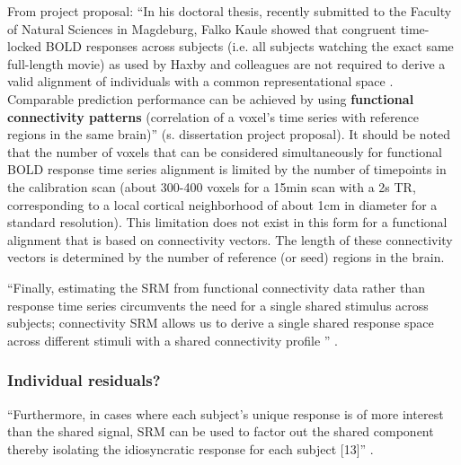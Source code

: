 From project proposal: ``In his doctoral thesis, recently submitted to the
Faculty of Natural Sciences in Magdeburg, Falko Kaule showed that congruent
time-locked BOLD responses across subjects (i.e. all subjects watching the exact
same full-length movie) as used by Haxby and colleagues are not required to
derive a valid alignment of individuals with a common representational space
\citep{kaule2017examination}.
%
Comparable prediction performance can be achieved by using \textbf{functional
connectivity patterns} (correlation of a voxel's time series with reference
regions in the same brain)'' (s. dissertation project proposal).
%
It should be noted that the number of voxels that can be considered
simultaneously for functional BOLD response time series alignment is limited by
the number of timepoints in the calibration scan (about 300-400 voxels for a
15min scan with a 2s TR, corresponding to a local cortical neighborhood of about
1cm in diameter for a standard resolution).
%
This limitation does not exist in this form for a functional alignment that is
based on connectivity vectors.
%
The length of these connectivity vectors is determined by the number of
reference (or seed) regions in the brain.


``Finally, estimating the SRM from functional connectivity
data rather than response time series circumvents the need for a single shared
stimulus across subjects; connectivity SRM allows us to derive a single shared
response space across different stimuli with a shared connectivity profile
\citep{nastase2019leveraging}'' \citep{kumar2020brainiak}.


\subsubsection{Individual residuals?}


%
``Furthermore, in cases where each subject's unique response is of more interest
than the shared signal, SRM can be used to factor out the shared component
thereby isolating the idiosyncratic response for each subject [13]''
\citep{kumar2020brainiak}.

